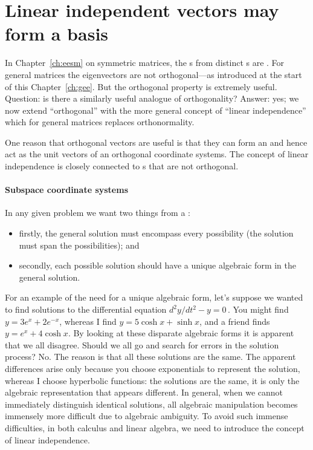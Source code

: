
\section{Linear independent vectors may form a basis}
\label{sec:lisb}
\secttoc
\begin{comment}
\pooliv{p.92--7,198--208} \holti{\S2.3}
\end{comment}



In Chapter~\ref{ch:eesm} on symmetric matrices, the s from distinct s are .  
For general matrices the eigenvectors are not orthogonal---as introduced at the start of this Chapter~\ref{ch:gee}.  
But the orthogonal property is extremely useful.
Question: is there a similarly useful analogue of orthogonality?
Answer: yes; we now extend ``orthogonal'' with the more general concept of ``linear independence'' which for general matrices replaces orthonormality.

One reason that orthogonal vectors are useful is that they can form an  and hence act as the unit vectors of an orthogonal coordinate systems.
The concept of linear independence is closely connected to s that are not orthogonal.



\paragraph{Subspace coordinate systems} In any given problem we want two things from a : 
\begin{itemize}
\item firstly, the general solution must encompass every possibility (the solution must span the possibilities); and 
\item secondly, each possible solution should have a unique algebraic form in the general solution.
\end{itemize}
For an example of the need for a unique algebraic form, let's suppose we wanted to find solutions to the differential equation \(d^2y/dt^2-y=0\)\,. 
You might find \(y=3e^x+2e^{-x}\), whereas I find \(y=5\cosh x+\sinh x\), and a friend finds \(y=e^x+4\cosh x\).
By looking at these disparate algebraic forms it is apparent that we all disagree.
Should we all go and search for errors in the solution process?  No.
The reason is that all these solutions are the same.
The apparent differences arise only because you choose exponentials to represent the solution, whereas I choose hyperbolic functions: the solutions are the same, it is only the algebraic representation that appears different. 
In general, when we cannot immediately distinguish identical solutions, all algebraic manipulation becomes immensely more difficult due to algebraic ambiguity.
To avoid such immense difficulties, in both calculus and linear algebra, we need to introduce the concept of linear independence.


